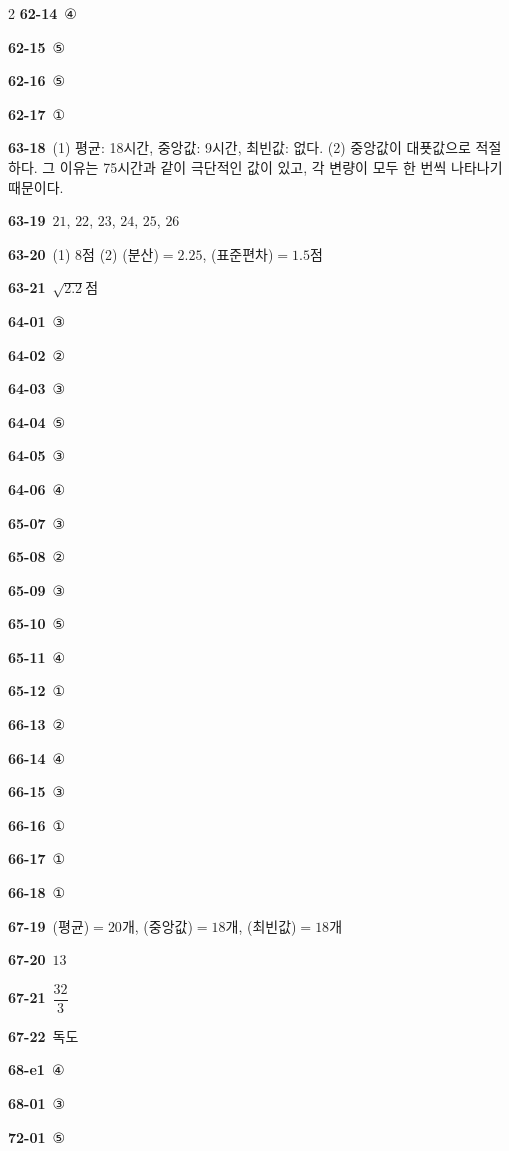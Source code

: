 \documentclass[10pt,a4paper]{article}
\begin{document}
\begin{multicols}{2}
\noindent\textbf{62-14}\ ④\par
\noindent\textbf{62-15}\ ⑤\par
\noindent\textbf{62-16}\ ⑤\par
\noindent\textbf{62-17}\ ①\par
\noindent\textbf{63-18}\ (1) 평균: 18시간, 중앙값: 9시간, 최빈값: 없다. (2) 중앙값이 대푯값으로 적절하다. 그 이유는 75시간과 같이 극단적인 값이 있고, 각 변량이 모두 한 번씩 나타나기 때문이다.\par
\noindent\textbf{63-19}\ $21$, $22$, $23$, $24$, $25$, $26$\par
\noindent\textbf{63-20}\ (1) 8점 (2) (분산)$=2.25$, (표준편차)$=1.5$점\par
\noindent\textbf{63-21}\ $\sqrt{2.2}$점\par
\noindent\textbf{64-01}\ ③\par
\noindent\textbf{64-02}\ ②\par
\noindent\textbf{64-03}\ ③\par
\noindent\textbf{64-04}\ ⑤\par
\noindent\textbf{64-05}\ ③\par
\noindent\textbf{64-06}\ ④\par
\noindent\textbf{65-07}\ ③\par
\noindent\textbf{65-08}\ ②\par
\noindent\textbf{65-09}\ ③\par
\noindent\textbf{65-10}\ ⑤\par
\noindent\textbf{65-11}\ ④\par
\noindent\textbf{65-12}\ ①\par
\noindent\textbf{66-13}\ ②\par
\noindent\textbf{66-14}\ ④\par
\noindent\textbf{66-15}\ ③\par
\noindent\textbf{66-16}\ ①\par
\noindent\textbf{66-17}\ ①\par
\noindent\textbf{66-18}\ ①\par
\noindent\textbf{67-19}\ (평균)$=20$개, (중앙값)$=18$개, (최빈값)$=18$개\par
\noindent\textbf{67-20}\ $13$\par
\noindent\textbf{67-21}\ $\dfrac{32}{3}$\par
\noindent\textbf{67-22}\ 독도\par
\noindent\textbf{68-e1}\ ④\par
\noindent\textbf{68-01}\ ③\par
\noindent\textbf{72-01}\ ⑤\par

\end{multicols}
\end{document}
